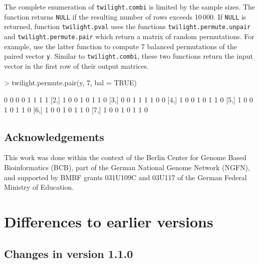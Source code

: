 \documentclass[11pt,a4paper,fleqn]{report}
\newcommand{\Rfunction}[1]{{\texttt{#1}}}
\newcommand{\Rfunarg}[1]{{\texttt{#1}}}
\begin{document}
The complete enumeration of \Rfunction{twilight.combi} is limited by the sample sizes. The function returns \Rfunarg{NULL} if the resulting number of rows exceeds 10\,000. If \Rfunarg{NULL} is returned, function \Rfunction{twilight.pval} uses the functions \Rfunction{twilight.permute.unpair} and \Rfunction{twilight.permute.pair} which return a matrix of random permutations. For example, use the latter function to compute 7 balanced permutations of the paired vector \Rfunarg{y}. Similar to \Rfunction{twilight.combi}, these two functions return the input vector in the first row of their output matrices.
\begin{Schunk}
\begin{Sinput}
> twilight.permute.pair(y, 7, bal = TRUE)
\end{Sinput}
\begin{Soutput}
     [,1] [,2] [,3] [,4] [,5] [,6] [,7] [,8]
[1,]    0    0    0    0    1    1    1    1
[2,]    1    0    0    1    0    1    1    0
[3,]    0    0    1    1    1    1    0    0
[4,]    1    0    0    1    0    1    1    0
[5,]    1    0    0    1    0    1    1    0
[6,]    1    0    0    1    0    1    1    0
[7,]    1    0    0    1    0    1    1    0
\end{Soutput}
\end{Schunk}






\section*{Acknowledgements}

This work was done within the context of the Berlin Center for Genome Based Bioinformatics (BCB), part of the German National Genome Network (NGFN), and supported by BMBF grants 031U109C and 03U117 of the German Federal Ministry of Education.








\chapter{Differences to earlier versions}


\section{Changes in version 1.1.0}
\end{document}
